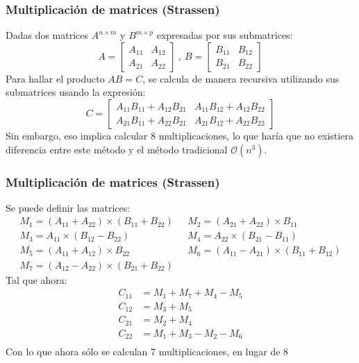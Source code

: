 \documentclass[10pt]{beamer}
\begin{document}
    \begin{frame}
        \frametitle{Multiplicación de matrices (Strassen)}
        Dadas dos matrices $A^{n\times m}$ y $B^{m\times p}$ expresadas por sus submatrices:
        \begin{equation*}
            A = 
            \begin{bmatrix}
                A_{11} & A_{12} \\
                A_{21} & A_{22}
            \end{bmatrix}
            \ , \ B =
            \begin{bmatrix}
                B_{11} & B_{12} \\
                B_{21} & B_{22}
            \end{bmatrix}
        \end{equation*}
        Para hallar el producto $AB = C$, se calcula de manera recursiva utilizando sus submatrices usando la expresión:
        \begin{equation*}
            C = \begin{bmatrix}
                A_{11}B_{11} + A_{12}B_{21} & A_{11}B_{12} + A_{12}B_{22} \\
                A_{21}B_{11} + A_{22}B_{21} & A_{21}B_{12} + A_{22}B_{22}
            \end{bmatrix}
        \end{equation*}
        Sin embargo, eso implica calcular 8 multiplicaciones, lo que haría que no existiera diferencia entre este método y el método tradicional $\mathcal{O}(n^3)$.
    \end{frame}
    \begin{frame}
        \frametitle{Multiplicación de matrices (Strassen)}
        Se puede definir las matrices:
        \begin{align*}
            M_1 = (A_{11} + A_{22})\times(B_{11} + B_{22}) &\ \ \ M_2 = (A_{21} + A_{22})\times{B_11} \\
            M_3 = A_{11} \times (B_{12} - B_{22}) &\ \ \ M_4 = A_{22}\times(B_{21} - B_{11}) \\
            M_5 = (A_{11} + A_{12})\times B_{22} &\ \ \ M_6 = (A_{11} - A_{21})\times(B_{11} + B_{12}) \\
            M_7 = (A_{12} - A_{22})\times(B_{21} + B_{22}) &
        \end{align*}
        Tal que ahora:
        \begin{align*}
            C_{11} &= M_1 + M_7 + M_4 - M_5 \\
            C_{12} &= M_3 + M_5 \\
            C_{21} &= M_2 + M_4 \\
            C_{22} &= M_1 + M_3 - M_2 - M_6 \\           
        \end{align*}
        Con lo que ahora sólo se calculan 7 multiplicaciones, en lugar de 8
    \end{frame}
\end{document}
